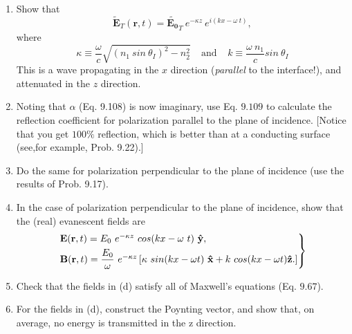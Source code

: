 \documentclass[fleqn]{article}
\begin{document}
\begin{enumerate}
    \begin{enumerate}
      \item Show that
      $$
        \mathbf{\tilde{E}}_T(\mathbf{r}, t)=\mathbf{\tilde{E_0}}_T ~ e^{-\kappa z} ~ e^{i(kx-\omega ~ t)},
      $$
      where 
      $$
        \kappa \equiv \dfrac{\omega}{c} \sqrt{\left(n_1 ~ sin ~ \theta_I\right)^2-n_2^2} ~~~~~ \text{and} ~~~~~ k \equiv \dfrac{\omega ~ n_1}{c} sin ~ \theta_I 
      $$
      This is a wave propagating in the $x$ direction (\emph{parallel} to the interface!), and attenuated in the $z$ direction.


      \item Noting that $\alpha$ (Eq. 9.108) is now imaginary, use Eq. $9.109$ to calculate the reflection coefficient for polarization 
      parallel to the plane of incidence. [Notice that you get $100\%$ reflection, which is better than at a conducting 
      surface (see,for example, Prob. 9.22).]


      \item Do the same for polarization perpendicular to the plane of incidence (use the
      results of Prob. 9.17).


      \item In the case of polarization perpendicular to the plane of incidence, show that
      the (real) evanescent fields are
      $$
        \begin{rcases*}
          \mathbf{E(r},t)=E_0 ~ e^{-\kappa z} ~ cos(kx-\omega ~ t) ~ \mathbf{\hat{y}},
          \\
          \mathbf{B(r},t)=\dfrac{E_0}{\omega} ~ e^{-\kappa z} \left[
            \kappa ~ sin(kx-\omega t) ~ \mathbf{\hat{x}}+k ~ cos(kx-\omega t) \mathbf{\hat{z}}.
          \right]
        \end{rcases*}
      $$


      \item Check that the fields in (d) satisfy all of Maxwell’s equations (Eq. $9.67$).
      


      \item For the fields in (d), construct the Poynting vector, and show that, on average, no energy is transmitted in the z direction.
      

    \end{enumerate}

  \end{enumerate}
\end{document}
